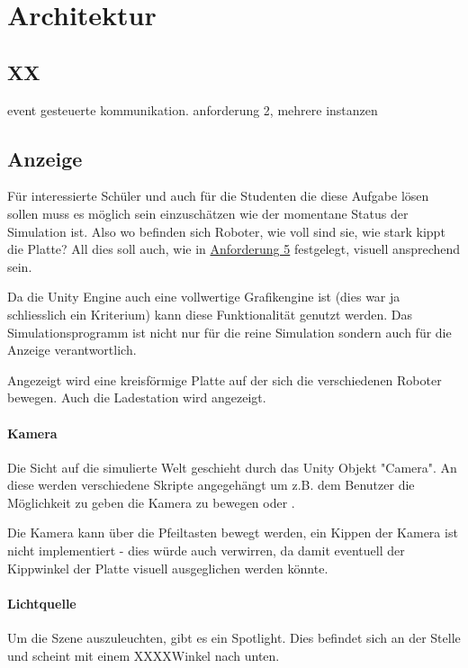 \clearpage
\section{Architektur}

\subsection{XX}
event gesteuerte kommunikation.
anforderung 2, mehrere instanzen

\subsection{Anzeige}\label{graphics}
F{\"{u}}r interessierte Sch{\"{u}}ler und auch f{\"{u}}r die Studenten die diese Aufgabe l{\"{o}}sen
sollen muss es m{\"{o}}glich sein einzusch{\"{a}}tzen wie der momentane Status der Simulation ist.
Also wo befinden sich Roboter, wie voll sind sie, wie stark kippt die Platte? All dies soll auch, wie
in \hyperref[anforderung]{Anforderung 5} festgelegt, visuell ansprechend sein.

Da die Unity Engine auch eine vollwertige Grafikengine ist (dies war ja schliesslich ein Kriterium)
kann diese Funktionalit{\"{a}}t genutzt werden. Das Simulationsprogramm ist nicht nur f{\"{u}}r die
reine Simulation sondern auch f{\"{u}}r die Anzeige verantwortlich.

Angezeigt wird eine kreisf{\"{o}}rmige Platte auf der sich die verschiedenen Roboter bewegen. Auch die
Ladestation wird angezeigt.

\paragraph{Kamera} Die Sicht auf die simulierte Welt geschieht durch das Unity Objekt "Camera". An diese werden verschiedene Skripte angegeh{\"{a}}ngt um z.B. dem Benutzer die M{\"{o}}glichkeit zu
geben die Kamera zu bewegen oder .

Die Kamera kann {\"{u}}ber die Pfeiltasten bewegt werden, ein Kippen der Kamera ist nicht implementiert - dies w{\"{u}}rde auch verwirren, da damit eventuell der Kippwinkel der
Platte visuell ausgeglichen werden k{\"{o}}nnte.

\paragraph{Lichtquelle} Um die Szene auszuleuchten, gibt es ein Spotlight. Dies befindet sich an der Stelle  und scheint mit einem XXXX\textdegree Winkel nach unten.

